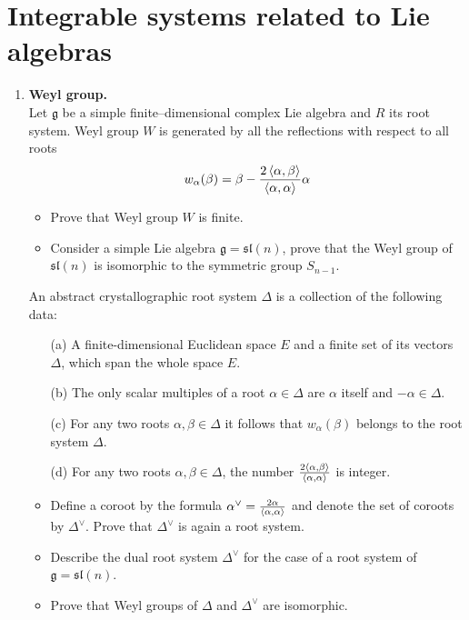 \documentclass[12pt]{article}
\theoremstyle{definition}
\begin{document}
\section{Integrable systems related to Lie algebras}
\begin{enumerate}
    \item \textbf{Weyl group.}\\
    Let $\mathfrak{g}$ be a simple finite–dimensional complex Lie algebra and $R$ its root system. Weyl group $W$ is generated by all the reflections with respect to all roots
    \begin{equation}
        w_\alpha(\beta)=\beta-\frac{2\braket{\alpha,\beta}}{\braket{\alpha,\alpha}}\alpha
    \end{equation}
    \begin{itemize}
        \item Prove that Weyl group $W$ is finite.
        \item Consider a simple Lie algebra $\mathfrak{g} = \mathfrak{sl}(n)$, prove that the Weyl group of $\mathfrak{sl}(n)$ is isomorphic to the symmetric group $S_{n-1}$.
    \end{itemize}
    An abstract crystallographic root system $\Delta$ is a collection of the following data:
    \begin{itemize}
        \item[(a)] A finite-dimensional Euclidean space $E$ and a finite set of its vectors $\Delta$, which span the whole space $E$.
        \item[(b)] The only scalar multiples of a root $\alpha\in\Delta$ are $\alpha$ itself and $-\alpha\in\Delta$.
        \item[(c)] For any two roots $\alpha,\beta\in\Delta$ it follows that $w_\alpha(\beta)$ belongs to the root system $\Delta$.
        \item[(d)] For any two roots $\alpha,\beta\in\Delta$, the number $\frac{2\braket{\alpha,\beta}}{\braket{\alpha,\alpha}}$ is integer.
    \end{itemize}
    \begin{itemize}
        \item Define a coroot by the formula $\alpha^\vee=\frac{2\alpha}{\braket{\alpha,\alpha}}$ and denote the set of coroots by $\Delta^\vee$. Prove that $\Delta^\vee$ is again a root system.
        \item Describe the dual root system $\Delta^\vee$ for the case of a root system of $\mathfrak{g}=\mathfrak{sl}(n)$.
        \item Prove that Weyl groups of $\Delta$ and $\Delta^\vee$ are isomorphic.

\end{itemize}
\end{enumerate}
\end{document}
